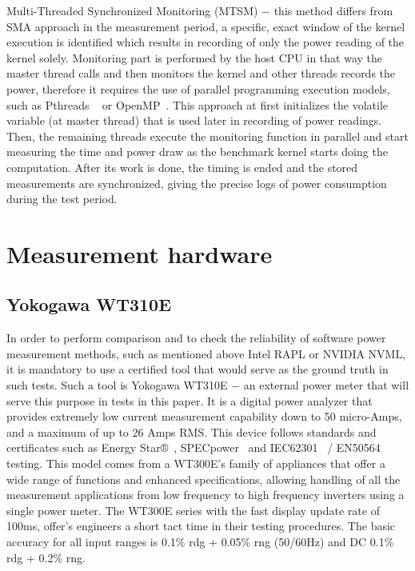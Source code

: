 Multi-Threaded Synchronized Monitoring (MTSM) $-$ this method
differs from SMA approach in the measurement period, a specific,
exact window of the kernel execution is identified which results
in recording of only the power reading of the kernel solely.
Monitoring part is performed by the host CPU in that way the
master thread calls and then monitors the kernel and other
threads records the power, therefore it requires the use of
parallel programming execution models, such as Pthreads
~\cite{Pthreads} or
OpenMP~\cite{OpenMP}. This approach at first initializes the volatile
variable (at master thread) that is used later in recording of
power readings. Then, the remaining threads execute the monitoring
function in parallel and start measuring the time and power draw
as the benchmark kernel starts doing the computation. After its
work is done, the timing is ended and the stored measurements
are synchronized, giving the precise logs of power consumption
during the test period.

\section{Measurement hardware}

\subsection{Yokogawa WT310E}

In order to perform comparison and to check the reliability
of software power measurement methods, such as mentioned
above Intel RAPL or NVIDIA NVML, it is mandatory to use
a certified tool that would serve as the ground truth in
such tests. Such a tool is Yokogawa WT310E $-$ an external
power meter that will serve this purpose in tests in this paper.
It is a digital power analyzer that provides extremely low
current measurement capability down to 50 micro-Amps, and
a maximum of up to 26 Amps RMS\@. This device follows standards
and certificates such as Energy Star®~\cite{EnergyStar},
SPECpower~\cite{SPEC} and IEC62301~\cite{IEC} / EN50564~\cite{iTeh}
testing. This model comes from a WT300E's family of appliances
that offer a wide range of functions and enhanced specifications,
allowing handling of all the measurement applications from low
frequency to high frequency inverters using a single power meter.
The WT300E series with the fast display update rate of 100ms,
offer's engineers a short tact time in their testing procedures.
The basic accuracy for all input ranges is 0.1\% rdg + 0.05\%
rng (50/60Hz) and DC 0.1\% rdg + 0.2\% rng.

